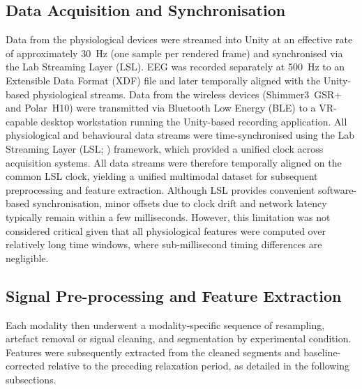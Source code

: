 \documentclass[lettersize,journal]{IEEEtran}
\begin{document}
\subsection{Data Acquisition and Synchronisation}


\label{sec:acquisition}
Data from the physiological devices were streamed into Unity at an effective rate of approximately 30~Hz (one sample per rendered frame) and synchronised via the Lab Streaming Layer (LSL). EEG was recorded separately at 500~Hz to an Extensible Data Format (XDF) file and later temporally aligned with the Unity-based physiological streams. Data from the wireless devices (Shimmer3~GSR+ and Polar~H10) were transmitted via Bluetooth Low Energy (BLE) to a VR-capable desktop workstation running the Unity-based recording application. All physiological and behavioural data streams were time-synchronised using the Lab Streaming Layer (LSL; \cite{kotheLabStreamingLayer2024}) framework, which provided a unified clock across acquisition systems. All data streams were therefore temporally aligned on the common LSL clock, yielding a unified multimodal dataset for subsequent preprocessing and feature extraction. Although LSL provides convenient software-based synchronisation, minor offsets due to clock drift and network latency typically remain within a few milliseconds. However, this limitation was not considered critical given that all physiological features were computed over relatively long time windows, where sub-millisecond timing differences are negligible.

\subsection{Signal Pre-processing and Feature Extraction}
Each modality then underwent a modality-specific sequence of resampling, artefact removal or signal cleaning, and segmentation by experimental condition. Features were subsequently extracted from the cleaned segments and baseline-corrected relative to the preceding relaxation period, as detailed in the following subsections.
\end{document}
